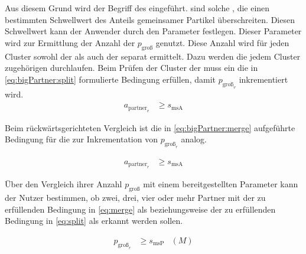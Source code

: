 Aus diesem Grund wird der Begriff des 
eingeführt.  sind solche , die einen bestimmten Schwellwert des Anteils gemeinsamer Partikel überschreiten. Diesen Schwellwert kann der Anwender durch den Parameter  festlegen. Dieser Parameter wird zur Ermittlung der Anzahl der  $p_\text{groß}$ genutzt. Diese Anzahl wird für jeden Cluster sowohl der  als auch der  separat ermittelt. Dazu werden die jedem Cluster zugehörigen  durchlaufen. Beim Prüfen der Cluster der  muss ein  die in \autoref{eq:bigPartner:split} formulierte Bedingung erfüllen, damit $p_{\text{groß}_v}$ inkrementiert wird.
\begin{equation}
	\begin{aligned}\label{eq:bigPartner:split}
		a_{\text{partner}_v} &\ge s_\text{msA}
	\end{aligned}
\end{equation}

Beim rückwärtsgerichteten Vergleich ist die in \autoref{eq:bigPartner:merge} aufgeführte Bedingung für die  zur Inkrementation von $p_{\text{groß}_r}$ analog. 

\begin{equation}
	\begin{aligned}\label{eq:bigPartner:merge}
		a_{\text{partner}_r} &\ge s_\text{msA}
	\end{aligned}
\end{equation}

Über den Vergleich ihrer Anzahl $p_\text{groß}$ mit einem bereitgestellten Parameter  kann der Nutzer bestimmen, ob zwei, drei, vier oder mehr Partner mit der zu erfüllenden Bedingung in \autoref{eq:merge} als  beziehungsweise der zu erfüllenden Bedingung in \autoref{eq:split} als  erkannt werden sollen.

\begin{equation}
\begin{aligned}\label{eq:merge}
p_{\text{groß}_r} &\ge s_\text{msP} &(M)
\end{aligned}
\end{equation}

